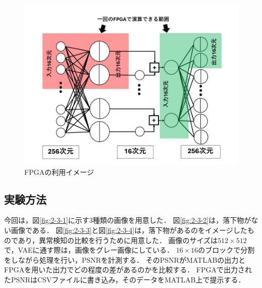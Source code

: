 \documentclass[paper]{ieicej}
\begin{document}
\begin{figure}[tb]
  \begin{center}
    \includegraphics[width=0.98\columnwidth]{figures/SoC_3.jpg}
  \end{center}
  \caption{FPGAの利用イメージ}
  \label{fig:2-2-4-3}
\end{figure}

\subsection{実験方法}
今回は，図\ref{fig:2-3-1}に示す3種類の画像を用意した．
図\ref{fig:2-3-2}は，落下物がない画像である．
図\ref{fig:2-3-3}と図\ref{fig:2-3-4}は，落下物があるのをイメージしたものであり，異常検知の比較を行うために用意した．
画像のサイズは$512\times512$で，VAEに通す際は，画像をグレー画像にしている．
$16\times16$のブロックで分割をしながら処理を行い，PSNRを計測する．
そのPSNRがMATLABの出力とFPGAを用いた出力でどの程度の差があるのかを比較する．
FPGAで出力されたPSNRはCSVファイルに書き込み，そのデータをMATLAB上で提示する．
\end{document}
